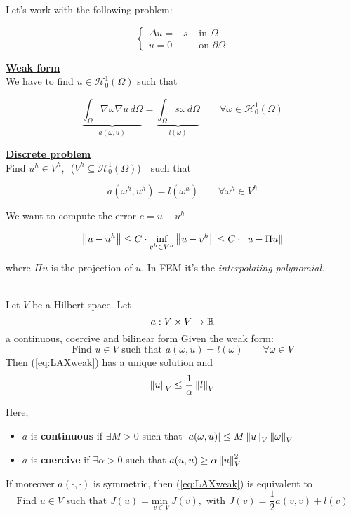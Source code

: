 Let's work with the following problem:

\begin{equation}\label{eq:LAXexample}
    \begin{cases}
      \Delta u = -s &\text{ in } \Omega \\
      u = 0         &\text{ on } \partial\Omega
    \end{cases}
\end{equation}

\underline{\textbf{Weak form}}\\

We have to find $u\in \mathcal{H}_0^1(\Omega)$ such that

\[
  \underbrace{\int_\Omega \nabla\omega\nabla u \, d\Omega}_{a(\omega, u)} = \underbrace{\int_{\Omega} s\omega \, d\Omega}_{l(\omega)} \qquad \forall \omega \in \mathcal{H}_0^1(\Omega)
\]

\underline{\textbf{Discrete problem}}\\

Find $u^h \in V^h$,$\,\,$ ($V^h \subseteq \mathcal{H}_0^1(\Omega)$) $\,\,$ such that 

\[
  a(\omega^h, u^h) = l(\omega^h) \qquad \forall \omega^h \in V^h
\]

We want to compute the error $e = u - u^h$

\[
  \left\lVert u-u^h\right\rVert \leq C\cdot \underset{v^h\in V^h}{\text{inf}} \left\lVert u-v^h\right\rVert \leq C\cdot\left\lVert u-\Pi u\right\rVert
\]

where $\Pi u$ is the projection of $u$. In FEM it's the \textit{interpolating polynomial}.\\
\begin{lemma}\-\\
  Let $V$ be a Hilbert space. Let $$a: V\times V \to \mathbb{R}$$ a continuous, coercive and bilinear form
  Given the weak form:
  \begin{equation}\label{eq:LAXweak}
      \text{Find } u \in V \text{ such that } a(\omega, u) = l(\omega) \qquad \forall \omega\in V
  \end{equation}
  Then (\ref{eq:LAXweak}) has a unique solution and $$\left\lVert u\right\rVert_V \leq \frac{1}{\alpha}\left\lVert l\right\rVert_V$$
  
  Here,
  \begin{itemize}
      \item[] $a$ is \textbf{continuous} if $\exists M>0$ such that $\left\vert a(\omega, u) \right\vert \leq M\left\lVert u\right\rVert_V\left\lVert\omega\right\rVert_V$
      
      \item[] $a$ is \textbf{coercive} if $\exists \alpha>0$ such that $a(u,u) \geq \alpha\left\lVert u\right\rVert_V^2$
  \end{itemize}
  
  If moreover $a(\cdot, \cdot)$ is symmetric, then (\ref{eq:LAXweak}) is equivalent to $$      \text{Find } u \in V \text{ such that } J(u) = \underset{v\in V}{\text{min }}J(v), \text{ with } J(v) = \frac{1}{2}a(v,v) + l(v)$$
\end{lemma}

